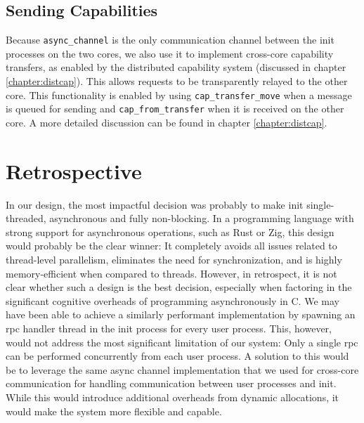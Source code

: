 \subsection{Sending Capabilities}
Because \texttt{async\_channel} is the only communication channel between the init processes on the two cores, we also use it to implement cross-core capability transfers, as enabled by the distributed capability system (discussed in chapter \ref{chapter:distcap}). This allows requests to be transparently relayed to the other core.
This functionality is enabled by using \texttt{cap\_transfer\_move} when a message is queued for sending and \texttt{cap\_from\_transfer} when it is received on the other core. A more detailed discussion can be found in chapter \ref{chapter:distcap}.

\section{Retrospective}
\label{section:rpc:limitations}
In our design, the most impactful decision was probably to make init single-threaded, asynchronous and fully non-blocking. In a programming language with strong support for asynchronous operations, such as Rust or Zig, this design would probably be the clear winner: It completely avoids all issues related to thread-level parallelism, eliminates the need for synchronization, and is highly memory-efficient when compared to threads. However, in retrospect, it is not clear whether such a design is the best decision, especially when factoring in the significant cognitive overheads of programming asynchronously in C. We may have been able to achieve a similarly performant implementation by spawning an rpc handler thread in the init process for every user process. 
This, however, would not address the most significant limitation of our system: Only a single rpc can be performed concurrently from each user process. A solution to this would be to leverage the same async channel implementation that we used for cross-core communication for handling communication between user processes and init. While this would introduce additional overheads from dynamic allocations, it would make the system more flexible and capable.
